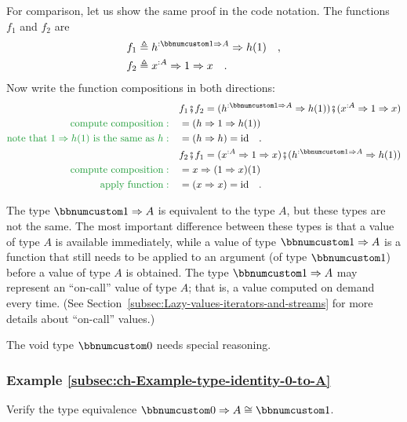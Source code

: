 For comparison, let us show the same proof in the code notation. The
functions $f_{1}$ and $f_{2}$ are 
\begin{align*}
 & f_{1}\triangleq h^{:\bbnum 1\Rightarrow A}\Rightarrow h(1)\quad,\\
 & f_{2}\triangleq x^{:A}\Rightarrow1\Rightarrow x\quad.
\end{align*}
Now write the function compositions in both directions:
\begin{align*}
 & f_{1}\bef f_{2}=(h^{:\bbnum 1\Rightarrow A}\Rightarrow h(1))\bef(x^{:A}\Rightarrow1\Rightarrow x)\\
{\color{greenunder}\text{compute composition}:}\quad & =\left(h\Rightarrow1\Rightarrow h(1)\right)\\
{\color{greenunder}\text{note that }1\Rightarrow h(1)\text{ is the same as }h:}\quad & =\left(h\Rightarrow h\right)=\text{id}\quad.\\
 & f_{2}\bef f_{1}=(x^{:A}\Rightarrow1\Rightarrow x)\bef(h^{:\bbnum 1\Rightarrow A}\Rightarrow h(1))\\
{\color{greenunder}\text{compute composition}:}\quad & =x\Rightarrow(1\Rightarrow x)(1)\\
{\color{greenunder}\text{apply function}:}\quad & =\left(x\Rightarrow x\right)=\text{id}\quad.
\end{align*}

The type $\bbnum 1\Rightarrow A$ is equivalent to the type $A$,
but these types are not the same. The most important difference between
these types is that a value of type $A$ is available immediately,
while a value of type $\bbnum 1\Rightarrow A$ is a function that
still needs to be applied to an argument (of type $\bbnum 1$) before
a value of type $A$ is obtained. The type $\bbnum 1\Rightarrow A$
may represent an ``on-call'' value of type
$A$; that is, a value computed on demand every time. (See Section~\ref{subsec:Lazy-values-iterators-and-streams}
for more details about ``on-call'' values.)

The void type $\bbnum 0$ needs special reasoning. 

\subsubsection{Example \label{subsec:ch-Example-type-identity-0-to-A}\ref{subsec:ch-Example-type-identity-0-to-A}}

Verify the type equivalence $\bbnum 0\Rightarrow A\cong\bbnum 1$.

